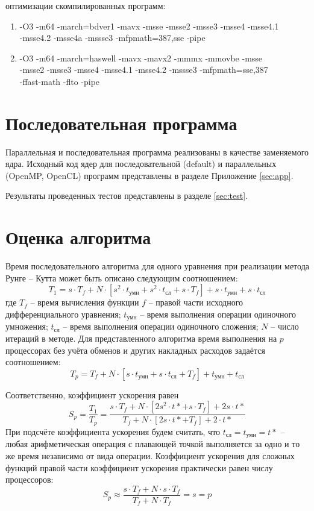 \documentclass[14pt,final,titlepage,pscyr]{hedwork}
\begin{document}
 оптимизации скомпилированных программ:
\begin{enumerate}
	\item -O3 -m64 -march=bdver1 -mavx -msse -msse2 -msse3 -msse4 -msse4.1 \\
		-msse4.2 -msse4a -mssse3 -mfpmath=387,sse -pipe
	\item -O3 -m64 -march=haswell -mavx -mavx2 -mmmx -mmovbe -msse \\
		-msse2 -msse3 -msse4 -msse4.1 -msse4.2 -mssse3 -mfpmath=sse,387 \\
		-ffast-math -flto -pipe
\end{enumerate}

\newpage

\section{Последовательная программа}
Параллельная и последовательная программа реализованы в качестве заменяемого ядра. Исходный код ядер для 
последовательной (default) и параллельных (OpenMP, OpenCL) программ представлены в разделе 
Приложение \eqref{sec:app}.

Результаты проведенных тестов представлены в разделе \ref{sec:test}. 

\section{Оценка алгоритма}
Время последовательного алгоритма для одного уравнения при реализации метода Рунге -- Кутта может быть 
описано следующим соотношением:
\[
	T_1 = s\cdot T_f + N \cdot \left[ s^2 \cdot t_\text{умн} + s^2 \cdot t_\text{сл} + 
		s \cdot T_f \right] + s \cdot t_\text{умн} + s \cdot t_\text{сл}
\]
где \( T_f \) -- время вычисления функции \( f \) -- правой части исходного дифференциального уравнения;
\( t_\text{умн} \) -- время выполнения операции одиночного умножения; \( t_\text{сл} \) -- время 
выполнения операции одиночного сложения; \( N \) -- число итераций в методе. Для представленного алгоритма 
время выполнения на \( p \) процессорах без учёта обменов и других накладных расходов задаётся соотношением:
\[
	T_p = T_f + N \cdot \left[ s \cdot t_\text{умн} + s \cdot t_\text{сл} + T_f \right] + 
		t_\text{умн} + t_\text{сл}
\]

Соответственно, коэффициент ускорения равен
\[
	S_p = \frac{T_1}{T_p} = \frac{s\cdot T_f + N\cdot\left[ 2s^2 \cdot t* + s\cdot T_f\right] + 2s\cdot t*}
			{T_f + N\cdot\left[ 2s\cdot t* + T_f\right] + 2\cdot t*}
\]
При подсчёте коэффициента ускорения будем считать, что \( t_\text{сл} = t_\text{умн} = t* \) -- любая 
арифметическая операция с плавающей точкой выполняется за одно и то же время независимо от вида операции.
Коэффициент ускорения для сложных функций правой части коэффициент ускорения практически равен числу 
процессоров:
\[
	S_p \approx \frac{s \cdot T_f + N \cdot s \cdot T_f}{T_f + N \cdot T_f } = s = p
\]
\end{document}
